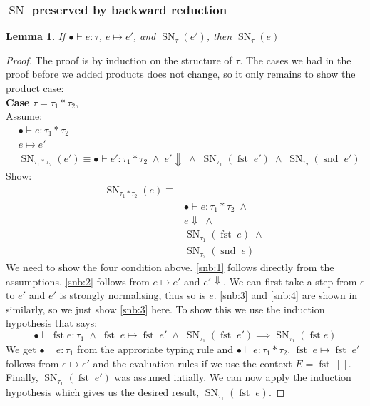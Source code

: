\documentclass[a4paper,10pt,fleqn]{article}
\DeclareMathOperator{\SNPred}{SN}
\DeclareMathOperator{\fst}{fst}
\DeclareMathOperator{\snd}{snd}
\newcommand{\evalto}{\ensuremath{\mapsto}}
\newcommand{\mtenv}{\ensuremath{\bullet}}
\newcommand{\case}[1]{~\\{\bf Case} #1,~\\}
\newcommand{\SN}[2]{\ensuremath{\SNPred_{#1}(#2)}}
\newcommand{\pand}{\ensuremath{\; \wedge \;}}
\newtheorem*{lemma}{Lemma}
\begin{document}
\subsubsection*{$\SNPred$ preserved by backward reduction}
\begin{lemma}
  If $\mtenv \vdash e : \tau$, $e \evalto e'$, and $\SN{\tau}{e'}$, then $\SN{\tau}{e}$
\end{lemma}
\begin{proof}
  The proof is by induction on the structure of $\tau$. The cases we had in the proof before we added products does not change, so it only remains to show the product case:
  \case{$\tau = \tau_1 * \tau_2$}
  Assume:
  \begin{align*}
    & \mtenv \vdash e : \tau_1 * \tau_2 \\
    & e \evalto e' \\
    & \SN{\tau_1*\tau_2}{e'} \equiv \mtenv \vdash e' : \tau_1 * \tau_2  \pand e' \Downarrow \pand \SN{\tau_1}{\fst \; e'} \pand \SN{\tau_2}{\snd \; e'}
  \end{align*}
  Show:  
  \begin{align}
    \SN{\tau_1*\tau_2}{e} \equiv & \nonumber \\
                                &\mtenv \vdash e : \tau_1 * \tau_2  \pand \label{snb:1}\\
                                &e \Downarrow \pand \label{snb:2}\\
                                &\SN{\tau_1}{\fst \; e} \pand \label{snb:3} \\
                                &\SN{\tau_2}{\snd \; e} \label{snb:4}
  \end{align}
  We need to show the four condition above. \ref{snb:1} follows directly from the assumptions. \ref{snb:2} follows from $e \evalto e'$ and $e' \Downarrow$. We can first take a step from $e$ to $e'$ and $e'$ is strongly normalising, thus so is $e$. \ref{snb:3} and \ref{snb:4} are shown in similarly, so we just show \ref{snb:3} here. To show this we use the induction hypothesis that says:
\[
  \mtenv \vdash \fst e : \tau_1 \pand \fst \; e \evalto \fst \; e' \pand \SN{\tau_1}{\fst \; e'} \implies \SN{\tau_1}{\fst e}
\]
We get $\mtenv \vdash e : \tau_1$ from the approriate typing rule and $\mtenv \vdash e : \tau_1 * \tau_2$. $\fst \; e \evalto \fst \; e'$ follows from $e \evalto e'$ and the evaluation rules if we use the context $E=\fst \; []$. Finally, $\SN{\tau_1}{\fst \; e'}$ was assumed intially. We can now apply the induction hypothesis which gives us the desired result, $\SN{\tau_1}{\fst \; e}$.
\end{proof}
\end{document}
